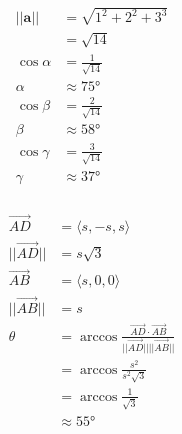 \documentclass{article}
\begin{document}
\setcounter{subsubsection}{24}
\subsubsection{}

\begin{align*}
  ||\mathbf{a}|| & = \sqrt{1^2 + 2^2 + 3^3} \\
                 & = \sqrt{14}              \\
  \cos \alpha    & = \frac{1}{\sqrt{14}}    \\
  \alpha         & \approx \ang{75}         \\
  \cos \beta     & = \frac{2}{\sqrt{14}}    \\
  \beta          & \approx \ang{58}         \\
  \cos \gamma    & = \frac{3}{\sqrt{14}}    \\
  \gamma         & \approx \ang{37}
\end{align*}

\setcounter{subsubsection}{28}
\subsubsection{}

\begin{align*}
  \overrightarrow{A D}     & = \langle s, -s, s \rangle                                                                                          \\
  ||\overrightarrow{A D}|| & = s \sqrt{3}                                                                                                        \\
  \overrightarrow{A B}     & = \langle s, 0, 0 \rangle                                                                                           \\
  ||\overrightarrow{A B}|| & = s                                                                                                                 \\
  \theta                   & = \arccos \frac{\overrightarrow{A D} \cdot \overrightarrow{A B}}{||\overrightarrow{A D}|| ||\overrightarrow{A B}||} \\
                           & = \arccos \frac{s^2}{s^2 \sqrt{3}}                                                                                  \\
                           & = \arccos \frac{1}{\sqrt{3}}                                                                                        \\
                           & \approx \ang{55}
\end{align*}
\end{document}
